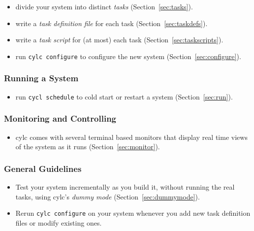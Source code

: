 \documentclass[11pt,a4paper]{article}
\begin{document}
\begin{itemize}
    \item divide your system into distinct {\em tasks} (Section~\ref{sec:tasks}).

    \item write a {\em task definition file} for each task (Section~\ref{sec:taskdefs}).

    \item write a {\em task script} for (at most) each task (Section~\ref{sec:taskscripts}).

    \item run \verb=cylc configure= to configure the new system (Section~\ref{sec:configure}).
\end{itemize}

\subsubsection{Running a System}

\begin{itemize}
    \item run \verb=cycl schedule= to cold start or restart a system (Section~\ref{sec:run}).
\end{itemize}


\subsubsection{Monitoring and Controlling}

\begin{itemize}
    \item cylc comes with several terminal based monitors that display
        real time views of the system as it runs (Section~\ref{sec:monitor}).
\end{itemize}


\subsubsection{General Guidelines}

\begin{itemize}

    \item Test your system incrementally as you build it, without
        running the real tasks, using cylc's {\em dummy mode}
        (Section~\ref{sec:dummymode}).

    \item Rerun \verb=cylc configure= on your system whenever you add
        new task definition files or modify existing ones.
\end{itemize}
\end{document}
